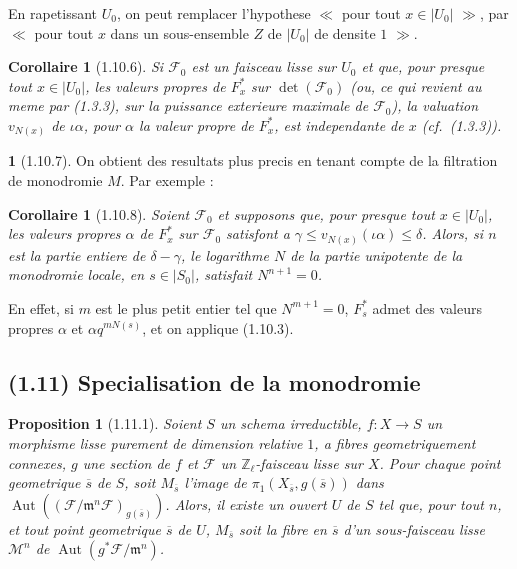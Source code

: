 \documentclass[12pt,a4paper]{article}
\theoremstyle{plain}
\newtheorem{proposition}[theorem]{Proposition}
\newtheorem{corollaire}[theorem]{Corollaire}
\theoremstyle{definition}
\theoremstyle{definition}
\newtheorem{para}{}[section]
\theoremstyle{remark}
\DeclareMathOperator{\Aut}{Aut}
\begin{document}
En rapetissant $U_0$, on peut remplacer l'hypothese $\ll$ pour tout $x \in |U_0|$ $\gg$, par $\ll$ pour tout $x$ dans un sous-ensemble $Z$ de $|U_0|$ de densite $1$ $\gg$.

\begin{corollaire}[1.10.6]
Si $\mathscr{F}_0$ est un faisceau lisse sur $U_0$ et que, pour presque tout $x \in |U_0|$, les valeurs propres de $F_x^*$ sur $\det(\mathscr{F}_0)$ (ou, ce qui revient au meme par (1.3.3), sur la puissance exterieure maximale de $\mathscr{F}_0$), la valuation $v_{N(x)}$ de $\iota\alpha$, pour $\alpha$ la valeur propre de $F_x^*$, est independante de $x$ (cf.~(1.3.3)).
\end{corollaire}

\begin{para}[1.10.7]
On obtient des resultats plus precis en tenant compte de la filtration de monodromie $M$. Par exemple :
\end{para}

\begin{corollaire}[1.10.8]
Soient $\mathscr{F}_0$ et supposons que, pour presque tout $x \in |U_0|$, les valeurs propres $\alpha$ de $F_x^*$ sur $\mathscr{F}_0$ satisfont a $\gamma \leq v_{N(x)}(\iota\alpha) \leq \delta$. Alors, si $n$ est la partie entiere de $\delta - \gamma$, le logarithme $N$ de la partie unipotente de la monodromie locale, en $s \in |S_0|$, satisfait $N^{n+1} = 0$.
\end{corollaire}

En effet, si $m$ est le plus petit entier tel que $N^{m+1} = 0$, $F_s^*$ admet des valeurs propres $\alpha$ et $\alpha q^{m N(s)}$, et on applique (1.10.3).

\newpage

\subsection*{(1.11) Specialisation de la monodromie}

\begin{proposition}[1.11.1]
Soient $S$ un schema irreductible, $f: X \to S$ un morphisme lisse purement de dimension relative $1$, a fibres geometriquement connexes, $g$ une section de $f$ et $\mathscr{F}$ un $\mathbb{Z}_\ell$-faisceau lisse sur $X$. Pour chaque point geometrique $\overline{s}$ de $S$, soit $M_{\overline{s}}$ l'image de $\pi_1(X_{\overline{s}}, g(\overline{s}))$ dans $\Aut((\mathscr{F}/\mathfrak{m}^n \mathscr{F})_{g(\overline{s})})$. Alors, il existe un ouvert $U$ de $S$ tel que, pour tout $n$, et tout point geometrique $\overline{s}$ de $U$, $M_{\overline{s}}$ soit la fibre en $\overline{s}$ d'un sous-faisceau lisse $\mathscr{M}^n$ de $\Aut(g^* \mathscr{F}/\mathfrak{m}^n)$.
\end{proposition}
\end{document}
